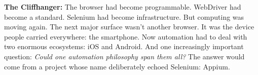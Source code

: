 \documentclass[11pt, a4paper, openany]{book}
\begin{document}
\noindent \textbf{The Cliffhanger:} The browser had become programmable. WebDriver had become a standard. Selenium had become infrastructure. But computing was moving again. The next major surface wasn't another browser. It was the device people carried everywhere: the smartphone. Now automation had to deal with two enormous ecosystems: iOS and Android. And one increasingly important question: \textit{Could one automation philosophy span them all?} The answer would come from a project whose name deliberately echoed Selenium: Appium.
\end{document}
